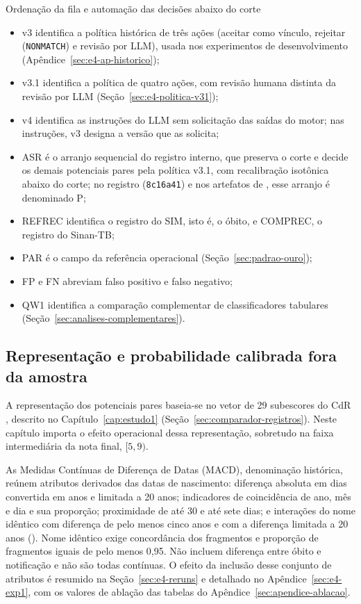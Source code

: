 \begin{chapter}{Ordenação da fila e automação das decisões abaixo do corte}
\begin{itemize}
\item v3 identifica a política histórica de três ações (aceitar como vínculo, rejeitar (\texttt{NONMATCH}) e revisão por LLM), usada nos experimentos de desenvolvimento (Apêndice~\ref{sec:e4-ap-historico});
\item v3.1 identifica a política de quatro ações, com revisão humana distinta da revisão por LLM (Seção~\ref{sec:e4-politica-v31});
\item v4 identifica as instruções do LLM sem solicitação das saídas do motor; nas instruções, v3 designa a versão que as solicita;
\item ASR é o arranjo sequencial do registro interno, que preserva o corte e decide os demais potenciais pares pela política v3.1, com recalibração isotônica abaixo do corte; no registro (\texttt{8c16a41}) e nos artefatos de , esse arranjo é denominado P;
\item REFREC identifica o registro do SIM, isto é, o óbito, e COMPREC, o registro do Sinan-TB;
\item PAR é o campo da referência operacional (Seção~\ref{sec:padrao-ouro});
\item FP e FN abreviam falso positivo e falso negativo;
\item QW1 identifica a comparação complementar de classificadores tabulares (Seção~\ref{sec:analises-complementares}).
\end{itemize}

\subsection{Representação e probabilidade calibrada fora da amostra}\label{sec:e4-representacao}\label{sec:e4-classificador-oof}

A representação dos potenciais pares baseia-se no vetor de 29 subescores do CdR \cite{Jardim2025comparador}, descrito no Capítulo~\ref{cap:estudo1} (Seção~\ref{sec:comparador-registros}). Neste capítulo importa o efeito operacional dessa representação, sobretudo na faixa intermediária da nota final, $[5,9)$.

As Medidas Contínuas de Diferença de Datas (MACD), denominação histórica, reúnem atributos derivados das datas de nascimento: diferença absoluta em dias convertida em anos e limitada a 20 anos; indicadores de coincidência de ano, mês e dia e sua proporção; proximidade de até 30 e até sete dias; e interações do nome idêntico com diferença de pelo menos cinco anos e com a diferença limitada a 20 anos (). Nome idêntico exige concordância dos fragmentos e proporção de fragmentos iguais de pelo menos 0,95. Não incluem diferença entre óbito e notificação e não são todas contínuas. O efeito da inclusão desse conjunto de atributos é resumido na Seção~\ref{sec:e4-reruns} e detalhado no Apêndice~\ref{sec:e4-exp1}, com os valores de ablação das tabelas do Apêndice~\ref{sec:apendice-ablacao}.


\end{chapter}

